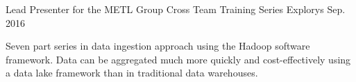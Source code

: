 \begin{cventries}
  \cventry
    {Lead Presenter for the METL Group} %
    {Cross Team Training Series} %
    {Explorys} %
    {Sep. 2016} %
    {
      \begin{cvcompactparagraph}
        Seven part series in data ingestion approach using the Hadoop software framework.  Data can be aggregated much more quickly and cost-effectively using a data lake framework than in traditional data warehouses.
      \end{cvcompactparagraph}
    }

\end{cventries}
